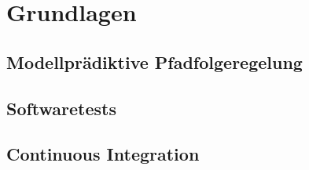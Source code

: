 \chapter{Grundlagen} \label{chap:Grundlagen}
\thispagestyle{empty}

\section{Modellprädiktive Pfadfolgeregelung} \label{sec:MPFC}

\section{Softwaretests} \label{sec:Softwaretests}

\section{Continuous Integration} \label{sec:CI}